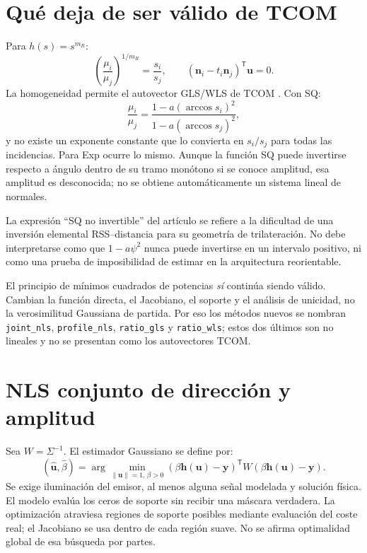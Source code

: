 \documentclass[11pt,a4paper]{article}
\begin{document}
\section{Qué deja de ser válido de TCOM}
Para $h(s)=s^{m_R}$:
\begin{equation}
 \left(\frac{\mu_i}{\mu_j}\right)^{1/m_R}=\frac{s_i}{s_j},\qquad
 (\mathbf n_i-t_i\mathbf n_j)^{\mathsf T}\mathbf u=0.
\end{equation}
La homogeneidad permite el autovector GLS/WLS de TCOM \cite{tcom}. Con SQ:
\begin{equation}
 \frac{\mu_i}{\mu_j}=\frac{1-a(\arccos s_i)^2}{1-a(\arccos s_j)^2},
\end{equation}
y no existe un exponente constante que lo convierta en $s_i/s_j$ para todas las incidencias. Para Exp ocurre lo mismo. Aunque la función SQ puede invertirse respecto a ángulo dentro de su tramo monótono si se conoce amplitud, esa amplitud es desconocida; no se obtiene automáticamente un sistema lineal de normales.

La expresión ``SQ no invertible'' del artículo \cite{bastiaens2020} se refiere a la dificultad de una inversión elemental RSS--distancia para su geometría de trilateración. No debe interpretarse como que $1-a\psi^2$ nunca puede invertirse en un intervalo positivo, ni como una prueba de imposibilidad de estimar en la arquitectura reorientable.

El principio de mínimos cuadrados de potencias \emph{sí} continúa siendo válido. Cambian la función directa, el Jacobiano, el soporte y el análisis de unicidad, no la verosimilitud Gaussiana de partida. Por eso los métodos nuevos se nombran \texttt{joint\_nls}, \texttt{profile\_nls}, \texttt{ratio\_gls} y \texttt{ratio\_wls}; estos dos últimos son no lineales y no se presentan como los autovectores TCOM.

\section{NLS conjunto de dirección y amplitud}
Sea $W=\Sigma^{-1}$. El estimador Gaussiano se define por:
\begin{equation}
 (\hat{\mathbf u},\hat\beta)=\arg\min_{\|\mathbf u\|=1,\,\beta>0}
 (\beta\mathbf h(\mathbf u)-\mathbf y)^{\mathsf T}W(\beta\mathbf h(\mathbf u)-\mathbf y).
\label{eq:joint}
\end{equation}
Se exige iluminación del emisor, al menos alguna señal modelada y solución física. El modelo evalúa los ceros de soporte sin recibir una máscara verdadera. La optimización atraviesa regiones de soporte posibles mediante evaluación del coste real; el Jacobiano se usa dentro de cada región suave. No se afirma optimalidad global de esa búsqueda por partes.
\end{document}
